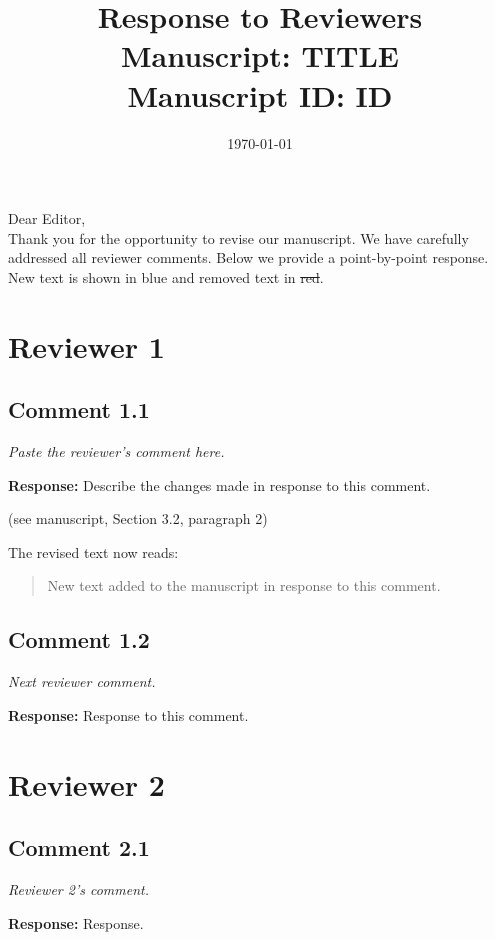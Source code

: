 \documentclass[11pt,a4paper]{article}
\title{Response to Reviewers\\[0.5em]
\large Manuscript: TITLE\\
\large Manuscript ID: ID}
\author{}
\date{\today}
\newcommand{\reviewercomment}[1]{%
    \vspace{0.5em}%
    \noindent\textit{\textcolor{reviewercolor}{#1}}%
    \vspace{0.5em}%
}
\newcommand{\response}[1]{%
    \noindent\textbf{Response:} #1%
}
\newcommand{\added}[1]{\textcolor{newtext}{#1}}
\newcommand{\removed}[1]{\textcolor{oldtext}{\sout{#1}}}
\newcommand{\pageref}[1]{(see manuscript, #1)}
\begin{document}
\maketitle

\noindent Dear Editor,\\[0.5em]
Thank you for the opportunity to revise our manuscript. We have carefully addressed all reviewer comments. Below we provide a point-by-point response. New text is shown in \added{blue} and removed text in \removed{red}.

\tableofcontents
\newpage

\section{Reviewer 1}

\subsection{Comment 1.1}
\reviewercomment{Paste the reviewer's comment here.}

\response{Describe the changes made in response to this comment.}

\pageref{Section 3.2, paragraph 2}

The revised text now reads:
\begin{quote}
\added{New text added to the manuscript in response to this comment.}
\end{quote}

\subsection{Comment 1.2}
\reviewercomment{Next reviewer comment.}

\response{Response to this comment.}

\section{Reviewer 2}

\subsection{Comment 2.1}
\reviewercomment{Reviewer 2's comment.}

\response{Response.}

\end{document}
